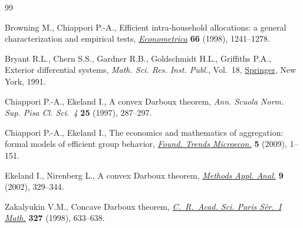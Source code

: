 \begin{thebibliography}{99}
\footnotesize\itemsep=0pt

Browning M., Chiappori P.-A., Efficient intra-household allocations: a general
 characterization and empirical tests, \href{https://doi.org/10.2307/2999616}{\textit{Econometrica}} \textbf{66}
 (1998), 1241--1278.

Bryant R.L., Chern S.S., Gardner R.B., Goldschmidt H.L., Griffiths P.A.,
 Exterior differential systems, \textit{Math. Sci. Res. Inst. Publ.}, Vol.~18,
 \href{https://doi.org/10.1007/978-1-4613-9714-4}{Springer}, New York, 1991.

Chiappori P.-A., Ekeland I., A convex {D}arboux theorem, \textit{Ann. Scuola
 Norm. Sup. Pisa Cl. Sci.~4} \textbf{25} (1997), 287--297.

Chiappori P.-A., Ekeland I., The economics and mathematics of aggregation:
 formal models of efficient group behavior, \href{https://doi.org/10.1561/0700000028}{\textit{Found. Trends Microecon.}}
 \textbf{5} (2009), 1--151.

Ekeland I., Nirenberg L., A convex {D}arboux theorem, \href{https://doi.org/10.4310/MAA.2002.v9.n3.a3}{\textit{Methods Appl. Anal.}} \textbf{9} (2002), 329--344.

Zakalyukin V.M., Concave {D}arboux theorem, \href{https://doi.org/10.1016/S0764-4442(99)80092-5}{\textit{C.~R.~Acad. Sci. Paris
 S\'{e}r.~{I} Math.}} \textbf{327} (1998), 633--638.

\end{thebibliography}
